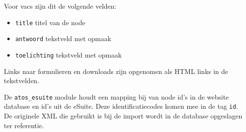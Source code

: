 Voor vacs zijn dit de volgende velden:
\begin{itemize}
\item \texttt{title} titel van de node
\item \texttt{antwoord} tekstveld met opmaak
\item \texttt{toelichting} tekstveld met opmaak
\end{itemize}

Links naar formulieren en downloads zijn opgenomen als HTML links in de tekstvelden.

De \texttt{atos\_esuite} module houdt een mapping bij van node id's in de website database en id's uit de eSuite. Deze identificatiecodes komen mee in de tag \texttt{id}. De originele XML die gebruikt is bij de import wordt in de database opgeslagen ter referentie.

